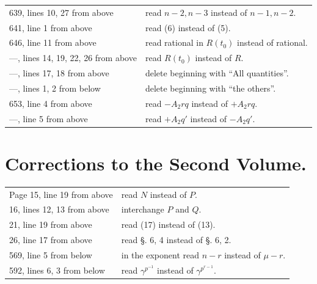 \documentclass[11pt]{article}
\begin{document}
\begin{longtable}{p{}p{}}
639, lines 10, 27 from above & read $n-2,n-3$ instead of $n-1,n-2$.\\
641, line 1 from above & read (6) instead of (5).\\
646, line 11 from above & read rational in $R(t_0)$ instead of rational.\\
---, lines 14, 19, 22, 26 from above & read $R(t_0)$ instead of $R$.\\
---, lines 17, 18 from above & delete beginning with ``All quantities''.\\
---, lines 1, 2 from below & delete beginning with ``the others''.\\
653, line 4 from above & read $-A_2rq$ instead of $+A_2rq$.\\
---, line 5 from above & read $+A_2q'$ instead of $-A_2q'$.\\
\end{longtable}

\section*{Corrections to the Second Volume.}
\begin{longtable}{p{}p{}}
Page 15, line 19 from above & read $N$ instead of $P$.\\
16, lines 12, 13 from above & interchange $P$ and $Q$.\\
21, line 19 from above & read (17) instead of (13).\\
26, line 17 from above & read §. 6, 4 instead of §. 6, 2.\\
569, line 5 from below & in the exponent read $n-r$ instead of $\mu-r$.\\
592, lines 6, 3 from below & read $\gamma^{p^{-1}}$ instead of $\gamma^{p^{r-1}}$.\\
\end{longtable}
\end{document}
